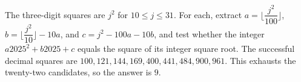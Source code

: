 The three-digit squares are $j^2$ for $10\le j\le31$. For each, extract $a=\lfloor \dfrac{j^2}{100}\rfloor$, $b=\lfloor \dfrac{j^2}{10}\rfloor-10a$, and $c=j^2-100a-10b$, and test whether the integer $a2025^2+b2025+c$ equals the square of its integer square root. The successful decimal squares are $100,121,144,169,400,441,484,900,961$. This exhausts the twenty-two candidates, so the answer is $\boxed9$.
